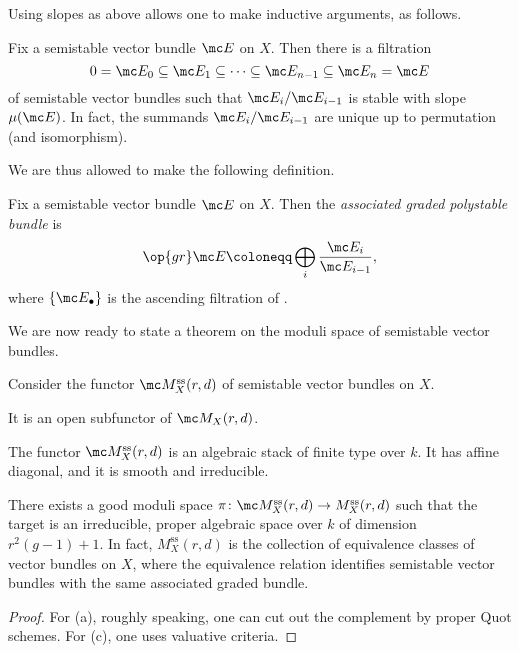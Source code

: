 \documentclass{article}
\begin{document}
Using slopes as above allows one to make inductive arguments, as follows.
\begin{proposition} \label{prop:jordan-holder}
    Fix a semistable vector bundle $\mc E$ on $X$. Then there is a filtration
    \[0=\mc E_0\subseteq\mc E_1\subseteq\cdots\subseteq\mc E_{n-1}\subseteq\mc E_n=\mc E\]
    of semistable vector bundles such that $\mc E_i/\mc E_{i-1}$ is stable with slope $\mu(\mc E)$. In fact, the summands $\mc E_i/\mc E_{i-1}$ are unique up to permutation (and isomorphism).
\end{proposition}
We are thus allowed to make the following definition.
\begin{definition}
    Fix a semistable vector bundle $\mc E$ on $X$. Then the \textit{associated graded polystable bundle} is
    \[\op{gr}\mc E\coloneqq\bigoplus_i\frac{\mc E_i}{\mc E_{i-1}},\]
    where $\{\mc E_\bullet\}$ is the ascending filtration of .
\end{definition}
We are now ready to state a theorem on the moduli space of semistable vector bundles.
\begin{theorem}
    Consider the functor $\mc M_X^{\mathrm{ss}}(r,d)$ of semistable vector bundles on $X$.
    \begin{listalph}
        \item It is an open subfunctor of $\mc M_X(r,d)$.
        \item The functor $\mc M_X^{\mathrm{ss}}(r,d)$ is an algebraic stack of finite type over $k$. It has affine diagonal, and it is smooth and irreducible.
        \item There exists a good moduli space $\pi\colon\mc M_X^{\mathrm{ss}}(r,d)\to M_X^{\mathrm{ss}}(r,d)$ such that the target is an irreducible, proper algebraic space over $k$ of dimension $r^2(g-1)+1$. In fact, $M_X^{\mathrm{ss}}(r,d)$ is the collection of equivalence classes of vector bundles on $X$, where the equivalence relation identifies semistable vector bundles with the same associated graded bundle.
    \end{listalph}
\end{theorem}
\begin{proof}
    For (a), roughly speaking, one can cut out the complement by proper $\mathrm{Quot}$ schemes. For (c), one uses valuative criteria.
\end{proof}
\end{document}
